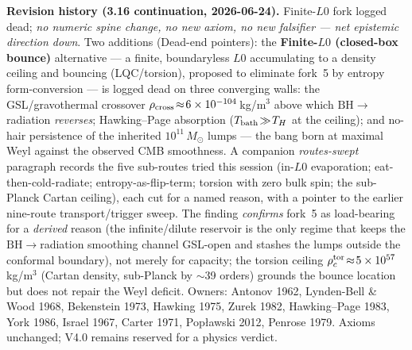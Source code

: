 \documentclass[11pt]{article}
\newcommand{\msun}{M_\odot}
\begin{document}
\smallskip\noindent\textbf{Revision history (3.16 continuation, 2026-06-24).} Finite-$L0$ fork logged dead; \emph{no numeric spine change, no new axiom, no new falsifier --- net epistemic direction down}. Two additions (Dead-end pointers): the \textbf{Finite-$L0$ (closed-box bounce)} alternative --- a finite, boundaryless $L0$ accumulating to a density ceiling and bouncing (LQC/torsion), proposed to eliminate fork~5 by entropy form-conversion --- is logged dead on three converging walls: the GSL/gravothermal crossover $\rho_{\rm cross}\!\approx\!6\times10^{-104}$\,kg/m$^3$ above which $\mathrm{BH}\!\to\!$radiation \emph{reverses}; Hawking--Page absorption ($T_{\rm bath}\!\gg\!T_H$ at the ceiling); and no-hair persistence of the inherited $10^{11}\,\msun$ lumps --- the bang born at maximal Weyl against the observed CMB smoothness. A companion \emph{routes-swept} paragraph records the five sub-routes tried this session (in-$L0$ evaporation; eat-then-cold-radiate; entropy-as-flip-term; torsion with zero bulk spin; the sub-Planck Cartan ceiling), each cut for a named reason, with a pointer to the earlier nine-route transport/trigger sweep. The finding \emph{confirms} fork~5 as load-bearing for a \emph{derived} reason (the infinite/dilute reservoir is the only regime that keeps the $\mathrm{BH}\!\to\!$radiation smoothing channel GSL-open and stashes the lumps outside the conformal boundary), not merely for capacity; the torsion ceiling $\rho_c^{\rm tor}\!\approx\!5\times10^{57}$\,kg/m$^3$ (Cartan density, sub-Planck by $\sim$39 orders) grounds the bounce location but does not repair the Weyl deficit. Owners: Antonov 1962, Lynden-Bell \& Wood 1968, Bekenstein 1973, Hawking 1975, Zurek 1982, Hawking--Page 1983, York 1986, Israel 1967, Carter 1971, Pop\l{}awski 2012, Penrose 1979. Axioms unchanged; V4.0 remains reserved for a physics verdict.
\end{document}
